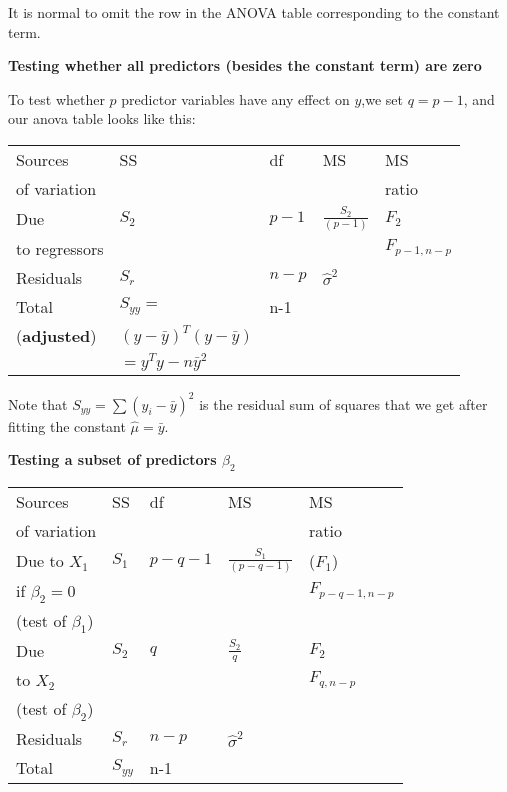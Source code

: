 It is normal to omit the row in the ANOVA table corresponding to the constant term.

\medskip
\textbf{Testing whether all predictors (besides the constant term) are zero}

To test whether $p$ predictor variables have any effect on $y$,we set $q=p-1$, and our anova table looks like this:

\begin{tabular}{|l|l|l|l|l|}
\hline
Sources & SS & df & MS & MS \\
of variation  & & & & ratio \\
\hline
Due & $S_2$ & $p-1$ & $\frac{S_2}{(p-1)}$ & $F_2$\\
 to regressors & & & &  $F_{p-1,n-p}$\\
\hline
Residuals   & $S_r$ & $n-p$ & $\hat{\sigma}^2$ & \\
\hline
Total        & $S_{yy}=$  & n-1 &  &\\
 (\textbf{adjusted})    & $(y-\bar{y})^T(y-\bar{y})$ & & & \\
& $=y^T y - n\bar{y}^2$ & & & \\
\hline
\end{tabular}

Note that $S_{yy}=\sum (y_i - \bar{y})^2$ is the residual sum of squares that we get after fitting the constant $\hat{\mu}=\bar{y}$.

\medskip
\textbf{Testing a subset of predictors $\beta_2$}

\begin{tabular}{|l|l|l|l|l|}
\hline
Sources & SS & df & MS & MS \\
of variation  & & & & ratio \\
\hline
Due to $X_1$   & $S_1$ & $p-q-1$ & $\frac{S_1}{(p-q-1)}$ & ($F_1$) \\
if $\beta_2=0$ & & & & $F_{p-q-1,n-p}$\\
(test of $\beta_1$) & & & & \\
\hline
Due & $S_2$ & $q$ & $\frac{S_2}{q}$ & $F_2$\\
 to $X_2$ & & & &  $F_{q,n-p}$\\
(test of $\beta_2$) & & & & \\
\hline
Residuals   & $S_r$ & $n-p$ & $\hat{\sigma}^2$ & \\
\hline
Total        & $S_{yy}$  & n-1 &  &\\
\hline
\end{tabular}

